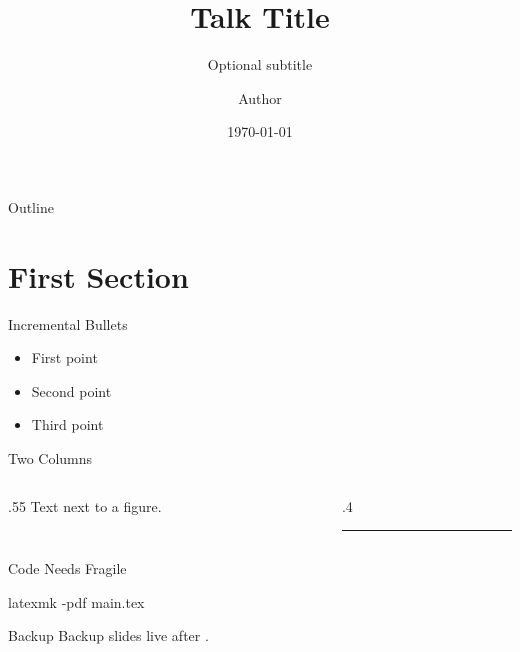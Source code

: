 \documentclass[aspectratio=169, 11pt]{beamer}
\title{Talk Title}
\subtitle{Optional subtitle}
\author{Author}
\institute{Institution}
\date{\today}
\begin{document}
\begin{frame}
  \titlepage
\end{frame}

\begin{frame}{Outline}
  \tableofcontents
\end{frame}

\section{First Section}

\begin{frame}{Incremental Bullets}
  \begin{itemize}[<+->]
    \item First point
    \item Second point
    \item Third point
  \end{itemize}
\end{frame}

\begin{frame}{Two Columns}
  \begin{columns}[T]
    \begin{column}{.55\textwidth}
      Text next to a figure. 
    \end{column}
    \begin{column}{.4\textwidth}
      \centering
      \rule{\linewidth}{3cm} %
    \end{column}
  \end{columns}
\end{frame}

\begin{frame}[fragile]{Code Needs Fragile}
\begin{semiverbatim}
latexmk -pdf main.tex
\end{semiverbatim}
\end{frame}

\appendix
\begin{frame}{Backup}
  Backup slides live after \texttt{\string\appendix}.
\end{frame}
\end{document}
